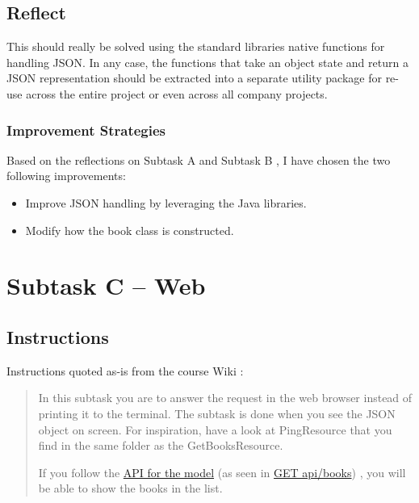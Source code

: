 \subsection{Reflect}\label{task-1b-reflect}
This should really be solved using the standard libraries native functions for
handling JSON. In any case, the functions that take an object state and return
a JSON representation should be extracted into a separate utility package for
re-use across the entire project or even across all company projects.

\subsubsection{Improvement Strategies}
Based on the reflections on Subtask A \cite{task-1a-reflect} and Subtask B
\cite{task-1b-reflect}, I have chosen the two following improvements:

\begin{itemize}
  \item Improve JSON handling by leveraging the Java libraries.
  \item Modify how the book class is constructed.
\end{itemize}





\section{Subtask C -- Web}\label{subtask-c-web}
\subsection{Instructions}\label{task-1-instructions}
Instructions quoted as-is from the course Wiki \cite{1dv600:lab1:instructions}:

\begin{quote}
  In this subtask you are to answer the request in the web browser instead of
  printing it to the terminal. The subtask is done when you see the JSON object
  on screen. For inspiration, have a look at PingResource that you find in the
  same folder as the GetBooksResource. 

  If you follow the 
  \href{https://htmlpreview.github.io/?https://github.com/tobias-dv-lnu/1dv600-lab/blob/master/api-specification/api-specification.html}{API for the model}
  (as seen in 
  \href{https://htmlpreview.github.io/?https://github.com/tobias-dv-lnu/1dv600-lab/blob/master/api-specification/api-specification.html\#books-get}{GET api/books})
  , you will be able to show the books in the list.
\end{quote}


